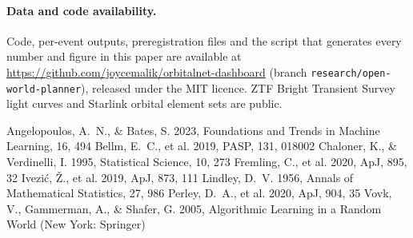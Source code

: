 \documentclass[12pt]{article}
\begin{document}
\paragraph{Data and code availability.} Code, per-event outputs, preregistration files and the script that generates every number and figure in this paper are available at \url{https://github.com/joycemalik/orbitalnet-dashboard} (branch \texttt{research/open-world-planner}), released under the MIT licence. ZTF Bright Transient Survey light curves and Starlink orbital element sets are public.
\begin{thebibliography}{}
 Angelopoulos, A.~N., \& Bates, S. 2023, Foundations and Trends in Machine Learning, 16, 494
 Bellm, E.~C., et al. 2019, PASP, 131, 018002
 Chaloner, K., \& Verdinelli, I. 1995, Statistical Science, 10, 273
 Fremling, C., et al. 2020, ApJ, 895, 32
 Ivezi\'c, \v{Z}., et al. 2019, ApJ, 873, 111
 Lindley, D.~V. 1956, Annals of Mathematical Statistics, 27, 986
 Perley, D.~A., et al. 2020, ApJ, 904, 35
 Vovk, V., Gammerman, A., \& Shafer, G. 2005, Algorithmic Learning in a Random World (New York: Springer)
\end{thebibliography}
\end{document}
